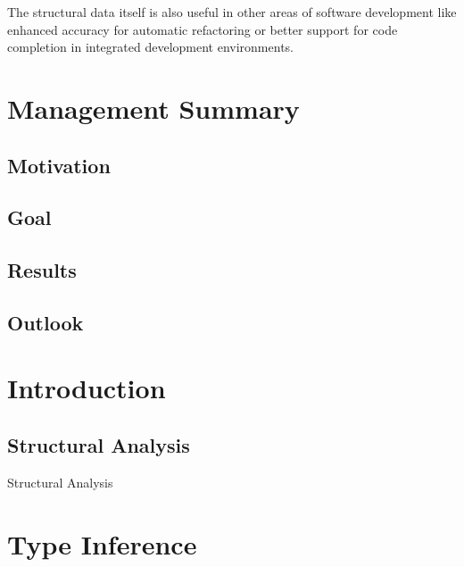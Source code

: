 \documentclass[12pt,halfparskip,DIV11,BCOR10mm]{scrreprt}
\begin{document}
The structural data itself is also useful in other areas of software development like enhanced accuracy for automatic refactoring or better support for code completion in integrated development environments.



\chapter*{Management Summary}

\section*{Motivation}

\section*{Goal}

\section*{Results}

\section*{Outlook}


\newpage

\tableofcontents

\newpage
{}
\pagestyle{scrheadings}

\chapter{Introduction}

\section{Structural Analysis}

Structural Analysis

\chapter{Type Inference}
\end{document}
